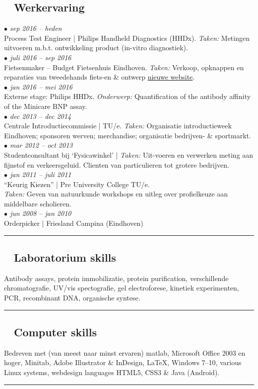 \documentclass[a4paper,10pt]{article}
\newcommand{\cvsection}[2]{
	\subsection*{{\color{DarkBlue} \textnormal{\faicon{#2}}~ #1}}
}
\newcommand{\cvbullet}[1]{
	\emph{\color{DarkBlue} $\bullet$ #1}
}
\newcommand{\secsep}{
	\vspace{3mm}
	\hrule
}
\begin{document}
\begin{multicols}{2}
	\cvsection{Werkervaring}{sticky-note}
	\cvbullet{sep 2016 -- heden}\\
		Process Test Engineer | Philips Handheld Diagnostics (HHDx). \emph{Taken:} Metingen uitvoeren m.b.t. ontwikkeling product (in-vitro diagnostiek).\\
	\cvbullet{juli 2016 -- sep 2016}\\
		Fietsenmaker -- Budget Fietsenhuis Eindhoven. \emph{Taken:} Verkoop, opknappen en reparaties van tweedehands fiets-en \& ontwerp \href{http://www.budgetfietsenhuis.nl}{nieuwe website}.\\
	\cvbullet{jan 2016 -- mei 2016}\\
		Externe stage: Philips HHDx. \emph{Onderwerp:} Quantification of the antibody affinity of the Minicare BNP assay.\\
	\cvbullet{dec 2013 -- dec 2014}\\
		Centrale Introductiecommissie | TU/e. \emph{Taken:} Organisatie introductieweek Eindhoven; sponsoren werven; merchandise; organisatie bedrijven- \& sportmarkt.\\ 
	\cvbullet{mar 2012 -- oct 2013}\\
		Studentconsultant bij `Fysicawinkel' | \emph{Taken:} Uit-voeren en verwerken meting aan fijnstof en verkeersgeluid. Clienten van particulieren tot grotere bedrijven.\\
	\cvbullet{jan 2011 -- juli 2011}\\
		``Keurig Kiezen'' | Pre University College TU/e.\\
		\emph{Taken:} Geven van natuurkunde workshops en uitleg over profielkeuze aan middelbare scholieren.\\
	\cvbullet{jun 2008 -- jan 2010}\\
		Orderpicker | Friesland Campina (Eindhoven)

	\secsep

	\cvsection{Laboratorium skills}{sticky-note}
		Antibody assays, protein immobilizatie, protein purification, verschillende chromatografie, UV/vis spectografie, gel electroforese, kinetiek experimenten, PCR, recombinant DNA, organische syntese.


	\secsep

	\cvsection{Computer skills}{sticky-note}
		Bedreven met (van meest naar minst ervaren) {\sc matlab}, Microsoft Office 2003 en hoger, Minitab, Adobe Illustrator \& InDesign, \LaTeX, Windows 7--10, various Linux systems, webdesign languages HTML5, CSS3 \& Java (Android).

	\secsep


\end{multicols}
\end{document}
